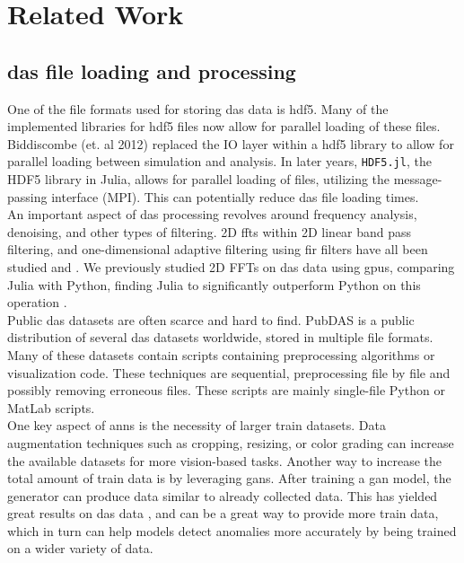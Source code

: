 \section{Related Work}
\label{relwork:anomaly}


\subsection{\acrshort{das} file loading and processing}

One of the file formats used for storing \acrshort{das} data is \acrshort{hdf5}. Many of the implemented libraries for \acrshort{hdf5} files now allow for parallel loading of these files. Biddiscombe (et. al 2012) \cite{biddiscombe2012parallel} replaced the IO layer within a \acrshort{hdf5} library to allow for parallel loading between simulation and analysis. In later years, \texttt{HDF5.jl}, the HDF5 library in Julia, allows for parallel loading of files, utilizing the message-passing interface (MPI). This can potentially reduce \acrshort{das} file loading times. \\ 

An important aspect of \acrshort{das} processing revolves around frequency analysis, denoising, and other types of filtering. 2D \acrfull{fft}s within 2D linear band pass filtering, and one-dimensional adaptive filtering using \acrfull{fir} filters have all been studied and \cite{daspreproc}. We previously studied 2D FFTs on \acrshort{das} data using \acrshort{gpu}s, comparing Julia with Python, finding Julia to significantly outperform Python on this operation \cite{projthesis}. \\

Public \acrshort{das} datasets are often scarce and hard to find. PubDAS \cite{spica2023pubdas} is a public distribution of several \acrshort{das} datasets worldwide, stored in multiple file formats. Many of these datasets contain scripts containing preprocessing algorithms or visualization code. These techniques are sequential, preprocessing file by file and possibly removing erroneous files. These scripts are mainly single-file Python or MatLab scripts. \\ 

One key aspect of \acrshort{ann}s is the necessity of larger train datasets. Data augmentation techniques such as cropping, resizing, or color grading can increase the available datasets for more vision-based tasks. Another way to increase the total amount of train data is by leveraging \acrshort{gan}s. After training a \acrshort{gan} model, the generator can produce data similar to already collected data. This has yielded great results on \acrshort{das} data \cite{Shiloh:19}, and can be a great way to provide more train data, which in turn can help models detect anomalies more accurately by being trained on a wider variety of data. \\

